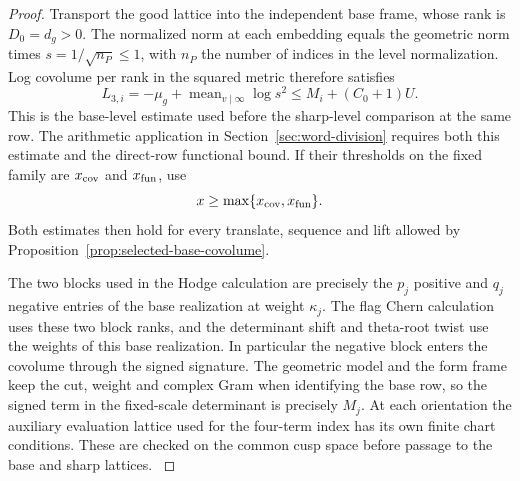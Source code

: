 \begin{proof}
Transport the good lattice into the independent base frame,
whose rank is \(D_0=d_g>0\). The normalized norm at each
embedding equals the geometric norm times \(s=1/\sqrt{n_P}\le1\),
with \(n_P\) the number of indices in the level normalization.
Log covolume per rank in the squared metric therefore satisfies
\[
 L_{3,i}=-\mu_g+\operatorname{mean}_{v\mid\infty}\log s^2
              \le M_i+(C_0+1)U .
\]
This is the base-level estimate used before the sharp-level
comparison at the same row. The arithmetic application in
Section~\ref{sec:word-division} requires both this estimate and the direct-row functional bound.
If their thresholds on the fixed family are \(x_{\rm cov}\) and
\(x_{\rm fun}\), use
\[
 x\ge\max\{x_{\rm cov},x_{\rm fun}\}.
\]
Both estimates then hold for every translate, sequence and lift
allowed by Proposition~\ref{prop:selected-base-covolume}.
\label{cor:covolume-component-transfer-23}

The two blocks used in the Hodge calculation are precisely
the \(p_j\) positive and \(q_j\) negative entries of the
base realization at weight \(\kappa_j\). The flag Chern calculation
uses these two block ranks, and the determinant shift and theta-root
twist use the weights of this base realization.
In particular the negative block enters the covolume through
the signed signature. The geometric model and the form
frame keep the cut, weight and complex Gram when identifying
the base row, so the signed term in the fixed-scale determinant
is precisely \(M_j\). At each orientation the auxiliary
evaluation lattice used for the four-term index has its own
finite chart conditions. These are checked on the common cusp
space before passage to the base and sharp lattices.
\label{cor:covolume-component-transfer-24}
\end{proof}
